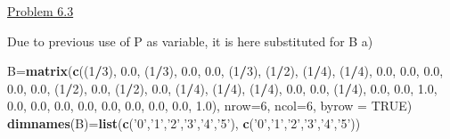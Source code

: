 \documentclass[]{article}
\newenvironment{Shaded}{\begin{snugshade}}{\end{snugshade}}
\newcommand{\DataTypeTok}[1]{\textcolor[rgb]{0.13,0.29,0.53}{#1}}
\newcommand{\DecValTok}[1]{\textcolor[rgb]{0.00,0.00,0.81}{#1}}
\newcommand{\FloatTok}[1]{\textcolor[rgb]{0.00,0.00,0.81}{#1}}
\newcommand{\KeywordTok}[1]{\textcolor[rgb]{0.13,0.29,0.53}{\textbf{#1}}}
\newcommand{\NormalTok}[1]{#1}
\newcommand{\OperatorTok}[1]{\textcolor[rgb]{0.81,0.36,0.00}{\textbf{#1}}}
\newcommand{\OtherTok}[1]{\textcolor[rgb]{0.56,0.35,0.01}{#1}}
\newcommand{\StringTok}[1]{\textcolor[rgb]{0.31,0.60,0.02}{#1}}
\begin{document}
\underline{Problem 6.3}

Due to previous use of P as variable, it is here substituted for B a)

\begin{Shaded}
\begin{Highlighting}[]
\NormalTok{B=}\KeywordTok{matrix}\NormalTok{(}\KeywordTok{c}\NormalTok{((}\DecValTok{1}\OperatorTok{/}\DecValTok{3}\NormalTok{), }\FloatTok{0.0}\NormalTok{, (}\DecValTok{1}\OperatorTok{/}\DecValTok{3}\NormalTok{), }\FloatTok{0.0}\NormalTok{, }\FloatTok{0.0}\NormalTok{, (}\DecValTok{1}\OperatorTok{/}\DecValTok{3}\NormalTok{), }
\NormalTok{           (}\DecValTok{1}\OperatorTok{/}\DecValTok{2}\NormalTok{), (}\DecValTok{1}\OperatorTok{/}\DecValTok{4}\NormalTok{), (}\DecValTok{1}\OperatorTok{/}\DecValTok{4}\NormalTok{), }\FloatTok{0.0}\NormalTok{, }\FloatTok{0.0}\NormalTok{, }\FloatTok{0.0}\NormalTok{, }
           \FloatTok{0.0}\NormalTok{, }\FloatTok{0.0}\NormalTok{, (}\DecValTok{1}\OperatorTok{/}\DecValTok{2}\NormalTok{), }\FloatTok{0.0}\NormalTok{, (}\DecValTok{1}\OperatorTok{/}\DecValTok{2}\NormalTok{), }\FloatTok{0.0}\NormalTok{,}
\NormalTok{           (}\DecValTok{1}\OperatorTok{/}\DecValTok{4}\NormalTok{), (}\DecValTok{1}\OperatorTok{/}\DecValTok{4}\NormalTok{), (}\DecValTok{1}\OperatorTok{/}\DecValTok{4}\NormalTok{), }\FloatTok{0.0}\NormalTok{, }\FloatTok{0.0}\NormalTok{, (}\DecValTok{1}\OperatorTok{/}\DecValTok{4}\NormalTok{),}
           \FloatTok{0.0}\NormalTok{, }\FloatTok{0.0}\NormalTok{, }\FloatTok{1.0}\NormalTok{, }\FloatTok{0.0}\NormalTok{, }\FloatTok{0.0}\NormalTok{, }\FloatTok{0.0}\NormalTok{, }
           \FloatTok{0.0}\NormalTok{, }\FloatTok{0.0}\NormalTok{, }\FloatTok{0.0}\NormalTok{, }\FloatTok{0.0}\NormalTok{, }\FloatTok{0.0}\NormalTok{, }\FloatTok{1.0}\NormalTok{), }\DataTypeTok{nrow=}\DecValTok{6}\NormalTok{, }\DataTypeTok{ncol=}\DecValTok{6}\NormalTok{, }\DataTypeTok{byrow =} \OtherTok{TRUE}\NormalTok{)}
\KeywordTok{dimnames}\NormalTok{(B)=}\KeywordTok{list}\NormalTok{(}\KeywordTok{c}\NormalTok{(}\StringTok{'0'}\NormalTok{,}\StringTok{'1'}\NormalTok{,}\StringTok{'2'}\NormalTok{,}\StringTok{'3'}\NormalTok{,}\StringTok{'4'}\NormalTok{,}\StringTok{'5'}\NormalTok{), }\KeywordTok{c}\NormalTok{(}\StringTok{'0'}\NormalTok{,}\StringTok{'1'}\NormalTok{,}\StringTok{'2'}\NormalTok{,}\StringTok{'3'}\NormalTok{,}\StringTok{'4'}\NormalTok{,}\StringTok{'5'}\NormalTok{))}
\end{Highlighting}
\end{Shaded}
\end{document}
